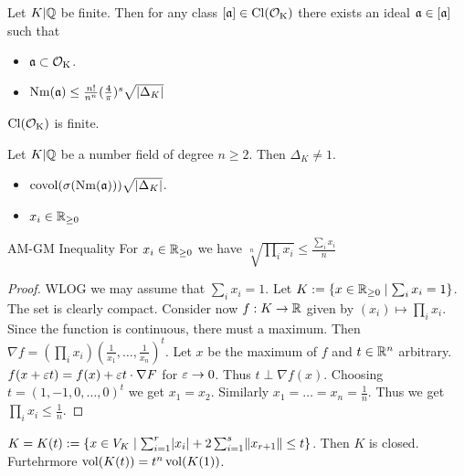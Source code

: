 \documentclass[12pt, a4paper]{article}
\DeclareMathOperator{\Nm}{Nm}
\DeclareMathOperator{\covol}{covol}
\DeclareMathOperator{\Rgez}{\R_{\geq 0}}
\begin{document}
	\begin{thm}{}{}
		Let $K \vert \Q$ be finite. Then for any class $[\aa] \in \Cl(\OK)$
		there exists an ideal $\aa \in [\aa]$ such that
		\begin{itemize}
			\item $\aa \subset \OK$.
			\item $\Nm(\aa) \leq \frac{n!}{n^n} (\frac{4}{\pi})^s \sqrt{\abs{\Delta_K}}$
		\end{itemize}
	\end{thm}

	\begin{cor}{}{}
		$\Cl(\OK)$ is finite.
	\end{cor}

	\begin{cor}{}{}
		Let $K \vert \Q$ be a number field of degree $n \geq 2$. Then 
		$\Delta_K \neq 1$.
	\end{cor}

	\begin{prop}{}{}
		\begin{itemize}
			\item $\covol(\sigma(\Nm(\aa))) \sqrt{\abs{\Delta_K}}$.
			\item $x_i \in \R_{\geq 0}$
		\end{itemize}
	\end{prop}

	\begin{prop}{AM-GM Inequality}{}
		For $x_i \in \Rgez$ we have 
		$\sqrt[n]{\prod_{i} x_i} \leq \frac{\sum_{i} x_i}{n}$	
	\end{prop}

	\begin{proof}
		WLOG we may assume that $\sum_{i} x_i = 1$. 
		Let $K := \{x \in \Rgez \mid \sum_{i} x_i = 1\} $.
		The set is clearly compact. Consider now $f: K \to \R$
		given by $(x_i) \mapsto \prod_{i} x_i$. Since the function 
		is continuous, there must a maximum. Then $\nabla f 
		= (\prod_{i} x_i) (\frac{1}{x_1}, \dots, \frac{1}{x_n})^t$.
		Let $x$ be the maximum of $f$ and $t \in \R^n$ arbitrary.
		$f(x + \eps t) = f(x) + \eps t \cdot \nabla F$ for $\eps \to 0$.
		Thus $t \perp \nabla f(x)$. Choosing $t = (1, -1, 0, \dots, 0)^t$
		we get $x_1 = x_2$. Similarly $x_1 = \dots = x_n = \frac{1}{n}$.
		Thus we get $\prod_{i} x_i \leq \frac{1}{n}$.
	\end{proof}

	$K = K(t) := \{x \in V_K \mid \sum_{i=1}^{r} \abs{x_i} + 
	2\sum_{i=1}^{s} \norm{x_{r+1}}\leq t\} $. Then $K$ is closed.
	Furtehrmore $\vol(K(t)) = t^n \vol(K(1))$.
\end{document}
